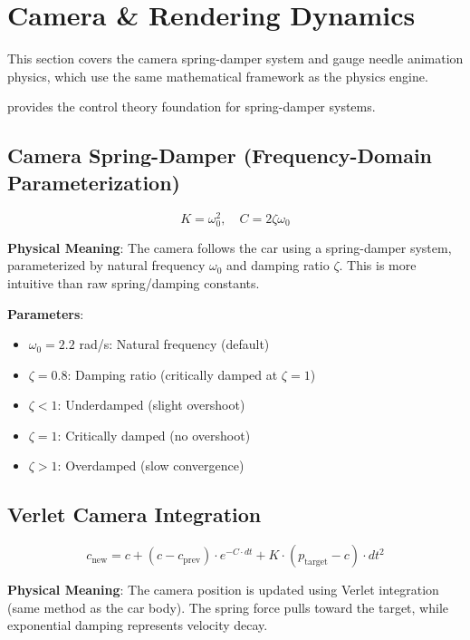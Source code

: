 \section{Camera \& Rendering Dynamics}

This section covers the camera spring-damper system and gauge needle animation physics, which use the same mathematical framework as the physics engine.

\cite{ogata2009modern} provides the control theory foundation for spring-damper systems.

\subsection{Camera Spring-Damper (Frequency-Domain Parameterization)}

\begin{equation}
  K = \omega_0^2, \quad C = 2 \zeta \omega_0
  \label{eq:spring-damper-params}
\end{equation}

\textbf{Physical Meaning}: The camera follows the car using a spring-damper system, parameterized by natural frequency $\omega_0$ and damping ratio $\zeta$. This is more intuitive than raw spring/damping constants.

\textbf{Parameters}:
\begin{itemize}
  \item $\omega_0 = 2.2$ rad/s: Natural frequency (default)
  \item $\zeta = 0.8$: Damping ratio (critically damped at $\zeta = 1$)
  \item $\zeta < 1$: Underdamped (slight overshoot)
  \item $\zeta = 1$: Critically damped (no overshoot)
  \item $\zeta > 1$: Overdamped (slow convergence)
\end{itemize}

\subsection{Verlet Camera Integration}

\begin{equation}
  c_{\text{new}} = c + (c - c_{\text{prev}}) \cdot e^{-C \cdot dt} + K \cdot (p_{\text{target}} - c) \cdot dt^2
  \label{eq:verlet-camera}
\end{equation}

\textbf{Physical Meaning}: The camera position is updated using Verlet integration (same method as the car body). The spring force pulls toward the target, while exponential damping represents velocity decay.

